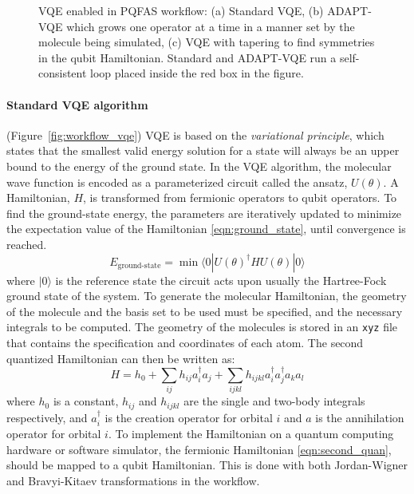 \documentclass[journal,onecolumn]{IEEEtran}
\begin{document}
\begin{figure}[!htb]
\begin{subfigure}[b]{0.15\textwidth}
    \caption{}
    \label{fig:workflow_vqe_tapering}
  \end{subfigure}
  \caption{ VQE enabled in PQFAS workflow: (a) Standard VQE, (b) ADAPT-VQE which grows one operator at a time in a manner set by the molecule being simulated, (c) VQE with tapering to find symmetries in the qubit Hamiltonian. Standard and ADAPT-VQE run a self-consistent loop placed inside the red box in the figure. }
  \label{fig:workflow_vqe_variations}
\end{figure}

 \paragraph{Standard VQE algorithm} (Figure~\ref{fig:workflow_vqe}) 
   VQE is based on the \emph{variational principle}, which states that the smallest valid energy solution for a state will always be an upper bound to the energy of the ground state. 
   In the VQE algorithm, the molecular wave function is encoded as a parameterized circuit called the ansatz, $U(\theta)$.
   A Hamiltonian, $H$, is transformed from fermionic operators to qubit operators. 
   To find the ground-state energy, the parameters are iteratively updated to minimize the expectation value of the Hamiltonian \eqref{eqn:ground_state}, until convergence is reached.
    \begin{equation}\label{eqn:ground_state}
    E_\text{ground-state} = \min \langle 0| U(\theta)^\dagger H U(\theta) |0\rangle
    \end{equation}
    where $|0\rangle$ is the reference state the circuit acts upon usually the Hartree-Fock ground state of the system. 
    To generate the molecular Hamiltonian, the geometry of the molecule and the basis set to be used must be specified, and the necessary integrals to be computed. 
    The geometry of the molecules is stored in an \texttt{xyz} file that contains the specification and coordinates of each atom. %
    The second quantized Hamiltonian can then be written as:
    \begin{equation}\label{eqn:second_quan}
      H = h_0 + \sum_{ij} h_{ij} a_i^\dagger a_j + \sum_{ijkl} h_{ijkl} a_i^\dagger a_j^\dagger a_k a_l
    \end{equation}
    where $h_0$ is a constant, $h_{ij}$ and $h_{ijkl}$ are the single and two-body integrals respectively, and $a_i^\dagger$ is the creation operator for orbital $i$ and $a$ is the annihilation operator for orbital $i$. 
    To implement the Hamiltonian on a quantum computing hardware or software simulator, the fermionic Hamiltonian \eqref{eqn:second_quan}, should be mapped to a qubit Hamiltonian.
    This is done with both Jordan-Wigner and Bravyi-Kitaev transformations in the workflow.
    
\end{document}

